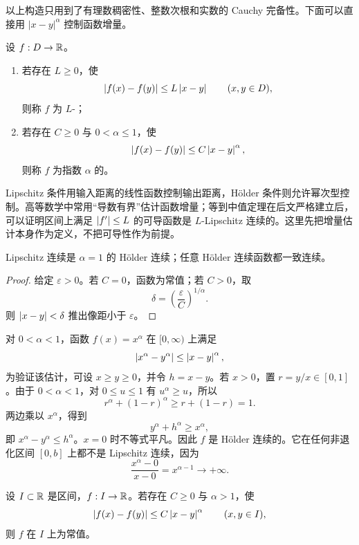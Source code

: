以上构造只用到了有理数稠密性、整数次根和实数的 Cauchy 完备性。下面可以直接用 \(|x-y|^\alpha\) 控制函数增量。

\begin{definition}
设 \(f:D\to\mathbb{R}\)。
\begin{enumerate}
 \item 若存在 \(L\ge0\)，使
 \[
  \left|f(x)-f(y)\right|\le L\left|x-y\right|\qquad(x,y\in D),
 \]
 则称 \(f\) 为 \(L\)-；
 \item 若存在 \(C\ge0\) 与 \(0<\alpha\le1\)，使
 \[
  \left|f(x)-f(y)\right|\le C\left|x-y\right|^{\alpha},
 \]
 则称 \(f\) 为指数 \(\alpha\) 的。
\end{enumerate}
\end{definition}

Lipschitz 条件用输入距离的线性函数控制输出距离，Hölder 条件则允许幂次型控制。高等数学中常用“导数有界”估计函数增量；等到中值定理在后文严格建立后，可以证明区间上满足 \(\left|f'\right|\le L\) 的可导函数是 \(L\)-Lipschitz 连续的。这里先把增量估计本身作为定义，不把可导性作为前提。

\begin{proposition}
Lipschitz 连续是 \(\alpha=1\) 的 Hölder 连续；任意 Hölder 连续函数都一致连续。
\end{proposition}

\begin{proof}
给定 \(\varepsilon>0\)。若 \(C=0\)，函数为常值；若 \(C>0\)，取
\[
 \delta=\left(\frac{\varepsilon}{C}\right)^{1/\alpha}.
\]
则 \(\left|x-y\right|<\delta\) 推出像距小于 \(\varepsilon\)。
\end{proof}

\begin{example}
对 \(0<\alpha<1\)，函数 \(f(x)=x^\alpha\) 在 \([0,\infty)\) 上满足
\[
 \left|x^\alpha-y^\alpha\right|\le\left|x-y\right|^{\alpha},
\]
为验证该估计，可设 \(x\ge y\ge0\)，并令 \(h=x-y\)。若 \(x>0\)，置 \(r=y/x\in[0,1]\)。由于 \(0<\alpha<1\)，对 \(0\le u\le1\) 有 \(u^\alpha\ge u\)，所以
\[
 r^\alpha+(1-r)^\alpha\ge r+(1-r)=1.
\]
两边乘以 \(x^\alpha\)，得到
\[
 y^\alpha+h^\alpha\ge x^\alpha,
\]
即 \(x^\alpha-y^\alpha\le h^\alpha\)。\(x=0\) 时不等式平凡。因此 \(f\) 是 Hölder 连续的。它在任何非退化区间 \([0,b]\) 上都不是 Lipschitz 连续，因为
\[
 \frac{x^\alpha-0}{x-0}=x^{\alpha-1}\to+\infty.
\]
\end{example}

\begin{proposition}
设 \(I\subset\mathbb{R}\) 是区间，\(f:I\to\mathbb{R}\)。若存在 \(C\ge0\) 与 \(\alpha>1\)，使
\[
 \left|f(x)-f(y)\right|\le C\left|x-y\right|^{\alpha}
 \qquad(x,y\in I),
\]
则 \(f\) 在 \(I\) 上为常值。
\end{proposition}

